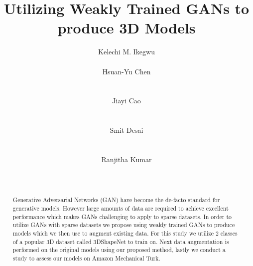 \documentclass{sigchi}
\begin{document}
\title{Utilizing Weakly Trained GANs to produce 3D Models}

\author{
  \alignauthor Kelechi M. Ikegwu\\
    \\
  \alignauthor Hsuan-Yu Chen\\
    \\
    \\
  \alignauthor Jiayi Cao\\
    \\
    \\
  \alignauthor Smit Desai\\
    \\
    \\
  \alignauthor Ranjitha Kumar\\
    \\
    \\  
}


\maketitle


\begin{abstract}
Generative Adversarial Networks (GAN) have become the de-facto standard for generative models. However large amounts of data are required to achieve excellent performance which makes GANs challenging to apply to sparse datasets. In order to utilize GANs with sparse datasets we propose using weakly trained GANs to produce models which we then use to augment existing data. For this study we utilize 2 classes of a popular 3D dataset called 3DShapeNet to train on. Next data augmentation is performed on the original models using our proposed method, lastly we conduct a study to assess our models on Amazon Mechanical Turk.

\end{abstract}
\end{document}
